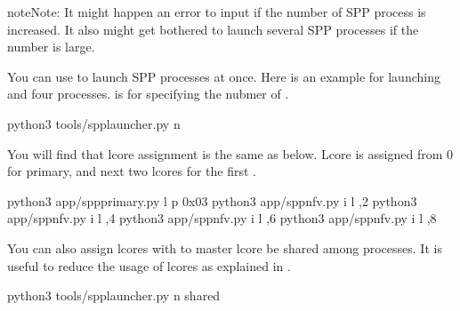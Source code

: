 \documentclass[a4paper,11pt,openany,oneside,english]{sphinxmanual}
\begin{document}
\begin{sphinxadmonition}{note}{Note:}
It might happen an error to input if the number of SPP process is
increased. It also might get bothered to launch several SPP
processes if the number is large.

You can use  to launch SPP processes
at once. Here is an example for launching  and
four  processes.  is for specifying the nubmer of
.

\begin{sphinxVerbatim}[commandchars=\\\{\},formatcom=\footnotesize]
 python3 tools/spp\PYGZhy{}launcher.py \PYGZhy{}n 
\end{sphinxVerbatim}

You will find that lcore assignment is the same as below.
Lcore is assigned from 0 for primary, and next two lcores for the
first .

\begin{sphinxVerbatim}[commandchars=\\\{\},formatcom=\footnotesize]
 python3 app/spp\PYGZhy{}primary.py \PYGZhy{}l  \PYGZhy{}p 0x03
 python3 app/spp\PYGZhy{}nfv.py \PYGZhy{}i  \PYGZhy{}l ,2
 python3 app/spp\PYGZhy{}nfv.py \PYGZhy{}i  \PYGZhy{}l ,4
 python3 app/spp\PYGZhy{}nfv.py \PYGZhy{}i  \PYGZhy{}l ,6
 python3 app/spp\PYGZhy{}nfv.py \PYGZhy{}i  \PYGZhy{}l ,8
\end{sphinxVerbatim}

You can also assign lcores with  to master lcore
be shared among  processes.
It is useful to reduce the usage of lcores as explained in
{\hyperref[\detokenize{tools/sppc/usecases:sppc-usecases-pktgen-l2fwd-less-lcores}]{}}.

\begin{sphinxVerbatim}[commandchars=\\\{\},formatcom=\footnotesize]
 python3 tools/spp\PYGZhy{}launcher.py \PYGZhy{}n  \PYGZhy{}\PYGZhy{}shared
\end{sphinxVerbatim}


\end{sphinxadmonition}
\end{document}
